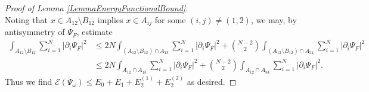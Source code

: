 \documentclass[a4paper,11pt]{article}
\newcommand{\norm}[1]{\left\lVert #1 \right\rVert}
\newcommand{\abs}[1]{\left\lvert #1 \right\rvert}
\newcommand{\R}{\mathbb{R}}
\newcommand{\rr}{\mathcal{R}}
\numberwithin{equation}{section}
\begin{document}
\begin{proof}[Proof of Lemma \ref{LemmaEnergyFunctionalBound}]
\begin{equation}
		\end{equation}	
		Noting that $x\in A_{12}\setminus B_{12}$ implies $x\in A_{ij}$ for some $(i,j)\neq (1,2)$, we may, by antisymmetry of $\Psi_F$, estimate\begin{equation}
		\begin{aligned}
		\int_{A_{12}\setminus B_{12}}\sum_{i=1}^{N}\abs{\partial_i\Psi_F}^2&\leq 2N\int_{(A_{12}\setminus B_{12})\cap A_{13}}\sum_{i=1}^{N}\abs{\partial_i\Psi_F}^2+\binom{N-2}{2}\int_{(A_{12}\setminus B_{12})\cap A_{34}}\sum_{i=1}^{N}\abs{\partial_i\Psi_F}^2\\
		&\leq 2N\int_{A_{12}\cap A_{13}}\sum_{i=1}^{N}\abs{\partial_i\Psi_F}^2+\binom{N-2}{2}\int_{A_{12}\cap A_{34}}\sum_{i=1}^{N}\abs{\partial_i\Psi_F}^2.
		\end{aligned}
		\end{equation}
		Thus we find $
		\mathcal{E}(\Psi_\omega)\leq E_0+E_1+E_2^{(1)}+E_2^{(2)}$ as desired.
	\end{proof}
\end{document}
